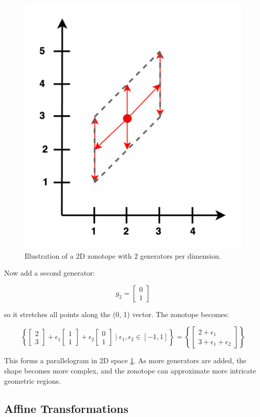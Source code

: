 \documentclass[oneside,11pt,dvipsnames]{book}
\numberwithin{equation}{section}
\theoremstyle{definition}
\theoremstyle{remark}
\begin{document}
\begin{figure}[h]
    \centering
    \includegraphics[width=0.5\linewidth]{figure/2-generator-zonotope.png}
    \caption{Illustration of a 2D zonotope with 2 generators per dimension.}
    \label{fig:2d2g-zonotope}
\end{figure}


Now add a second generator:

\[
g_2 = \begin{bmatrix}0 \\ 1\end{bmatrix} 
\]

so it stretches all points along the (0, 1) vector.
The zonotope becomes:

\[
\left\{
\begin{bmatrix}2 \\ 3\end{bmatrix} + \epsilon_1 \begin{bmatrix}1 \\ 1\end{bmatrix} + \epsilon_2 \begin{bmatrix}0 \\ 1\end{bmatrix}
\mid \epsilon_1, \epsilon_2 \in [-1, 1]
\right\}
= \left\{
\begin{bmatrix}2 + \epsilon_1 \\ 3 + \epsilon_1 + \epsilon_2\end{bmatrix}
\right\}
\]


This forms a parallelogram in 2D space \ref{fig:2d2g-zonotope}. As more generators are added, the shape becomes more complex, and the zonotope can approximate more intricate geometric regions.

\subsection{Affine Transformations}
\end{document}
